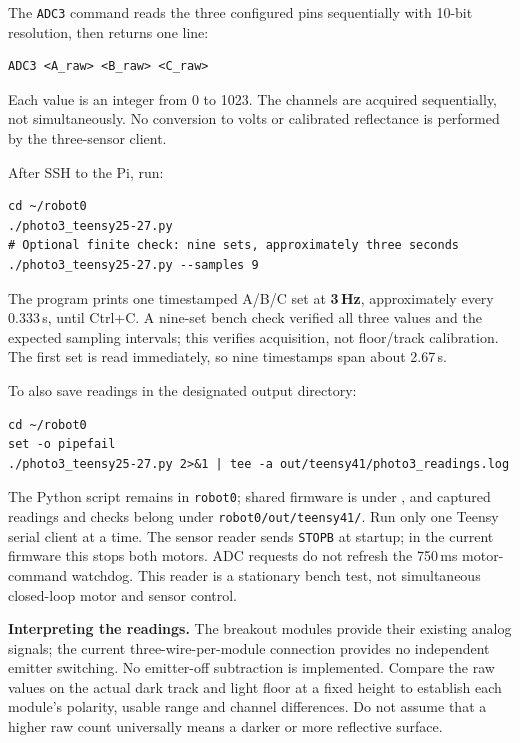 The \texttt{ADC3} command reads the three configured pins sequentially with 10-bit resolution, then returns one line:
\begin{verbatim}
ADC3 <A_raw> <B_raw> <C_raw>
\end{verbatim}
Each value is an integer from 0 to 1023. The channels are acquired sequentially, not simultaneously. No conversion to volts or calibrated reflectance is performed by the three-sensor client.

After SSH to the Pi, run:
\begin{verbatim}
cd ~/robot0
./photo3_teensy25-27.py
# Optional finite check: nine sets, approximately three seconds
./photo3_teensy25-27.py --samples 9
\end{verbatim}
The program prints one timestamped A/B/C set at \textbf{3\,Hz}, approximately every 0.333\,s, until Ctrl+C. A nine-set bench check verified all three values and the expected sampling intervals; this verifies acquisition, not floor/track calibration. The first set is read immediately, so nine timestamps span about 2.67\,s.

To also save readings in the designated output directory:
\begin{verbatim}
cd ~/robot0
set -o pipefail
./photo3_teensy25-27.py 2>&1 | tee -a out/teensy41/photo3_readings.log
\end{verbatim}
The Python script remains in \texttt{robot0}; shared firmware is under , and captured readings and checks belong under \texttt{robot0/out/teensy41/}. Run only one Teensy serial client at a time. The sensor reader sends \texttt{STOPB} at startup; in the current firmware this stops both motors. ADC requests do not refresh the 750\,ms motor-command watchdog. This reader is a stationary bench test, not simultaneous closed-loop motor and sensor control.

\noindent\textbf{Interpreting the readings.} The breakout modules provide their existing analog signals; the current three-wire-per-module connection provides no independent emitter switching. No emitter-off subtraction is implemented. Compare the raw values on the actual dark track and light floor at a fixed height to establish each module's polarity, usable range and channel differences. Do not assume that a higher raw count universally means a darker or more reflective surface.
